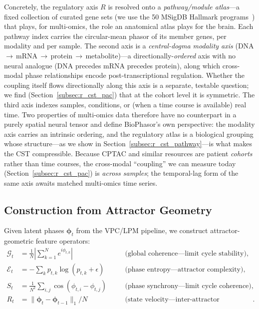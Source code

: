 \documentclass[preprint,12pt,amsmath,amssymb,superscriptaddress,floatfix]{revtex4-2}
\begin{document}
Concretely, the regulatory axis $R$ is resolved onto a \emph{pathway/module
atlas}---a fixed collection of curated gene sets (we use the 50 MSigDB
Hallmark programs~\cite{ref_liberzon_hallmark}) that plays, for multi-omics,
the role an anatomical atlas plays for the brain. Each pathway index carries
the circular-mean phasor of its member genes, per modality and per sample.
The second axis is a \emph{central-dogma modality axis}
(DNA\,$\rightarrow$\,mRNA\,$\rightarrow$\,protein\,$\rightarrow$\,metabolite)---a
directionally-\emph{ordered} axis with no neural analogue
(DNA precedes mRNA precedes protein), along which cross-modal phase
relationships encode post-transcriptional regulation. Whether the coupling
itself flows directionally along this axis is a separate, testable question;
we find (Section~\ref{subsec:r_cst_pac}) that at the cohort level it is
symmetric. The third axis indexes samples, conditions, or (when a time course
is available) real time. Two properties of multi-omics data therefore have no
counterpart in a purely spatial neural tensor and define BioPhasor's own
perspective: the modality axis carries an intrinsic ordering, and the
regulatory atlas is a
biological grouping whose structure---as we show in
Section~\ref{subsec:r_cst_pathway}---is what makes the CST compressible.
Because CPTAC and similar resources are patient \emph{cohorts} rather than
time courses, the cross-modal ``coupling'' we can measure today
(Section~\ref{subsec:r_cst_pac}) is \emph{across samples}; the temporal-lag
form of the same axis awaits matched multi-omics time series.


\subsection{Construction from Attractor Geometry}

Given latent phases $\boldsymbol{\phi}_t$ from the VPC/LPM pipeline,
we construct attractor-geometric feature operators:
\begin{align}
    \mathcal{G}_t &= \frac{1}{N}\left|\sum_{k=1}^{N}
    e^{i\phi_{t,k}}\right|
    &\quad &\text{(global coherence---limit cycle stability)},
    \label{eq:cst_coherence} \\
    \mathcal{E}_t &= -\sum_{k} p_{t,k}\log(p_{t,k}+\epsilon)
    &\quad &\text{(phase entropy---attractor complexity)},
    \label{eq:cst_entropy} \\
    S_t &= \frac{1}{N^2}\sum_{i,j}\cos(\phi_{t,i}-\phi_{t,j})
    &\quad &\text{(phase synchrony---limit cycle coherence)},
    \label{eq:cst_synchrony} \\
    R_t &= \|\boldsymbol{\phi}_t
    - \boldsymbol{\phi}_{t-1}\|_1/N
    &\quad &\text{(state velocity---inter-attractor transitions)}.
    \label{eq:cst_velocity}
\end{align}
\end{document}
